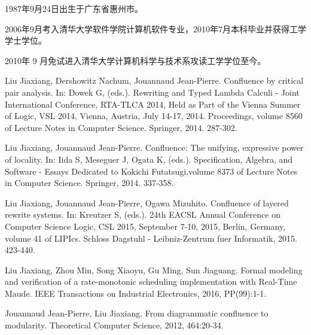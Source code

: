 \begin{resume}


  1987年9月24日出生于广东省惠州市。

  2006年9月考入清华大学软件学院计算机软件专业，2010年7月本科毕业并获得工学学士学位。

  2010年 9 月免试进入清华大学计算机科学与技术系攻读工学学位至今。


  \begin{publications}
    \item Liu Jiaxiang, Dershowitz Nachum, Jouannaud Jean-Pierre. Confluence by critical pair
    analysis. In: Dowek G, (eds.). Rewriting and Typed Lambda Calculi - Joint 
    International Conference, RTA-TLCA 2014, Held as Part of the Vienna Summer 
    of Logic, VSL 2014, Vienna, Austria, July 14-17, 2014. Proceedings, volume 
    8560 of Lecture Notes in Computer Science. Springer, 2014. 287-302.
    \item Liu Jiaxiang, Jouannaud Jean-Pierre. Confluence: The unifying, expressive power of 
    locality. In: Iida S, Meseguer J, Ogata K, (eds.). Specification, Algebra, 
    and Software - Essays Dedicated to Kokichi Futatsugi,volume 8373 of Lecture 
    Notes in Computer Science. Springer, 2014. 337-358.
    \item Liu Jiaxiang, Jouannaud Jean-Pierre, Ogawa Mizuhito. Confluence of layered rewrite systems. 
    In: Kreutzer S, (eds.). 24th EACSL Annual Conference on Computer Science 
    Logic, CSL 2015, September 7-10, 2015, Berlin, Germany, volume 41 of 
    LIPIcs. Schloss Dagstuhl - Leibniz-Zentrum fuer Informatik, 2015. 423-440.
  \end{publications}

  \begin{publications}[before=\publicationskip,after=\publicationskip]
    \item Liu Jiaxiang, Zhou Min, Song Xiaoyu, Gu Ming, Sun Jiaguang. Formal modeling and verification of a 
    rate-monotonic scheduling implementation with Real-Time Maude. IEEE 
    Transactions on Industrial Electronics, 2016, PP(99):1-1. 
  \end{publications}

  \begin{publications}
    \item Jouannaud Jean-Pierre, Liu Jiaxiang.  From diagrammatic confluence to modularity.  
    Theoretical Computer Science, 2012, 464:20-34.
  \end{publications}


\end{resume}
